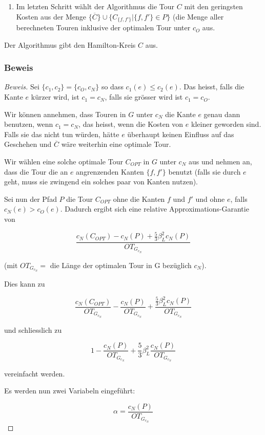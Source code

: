 \documentclass[a4paper,11pt]{scrreprt}
\begin{document}
\begin{enumerate}
\item Im letzten Schritt wählt der Algorithmus die Tour $C$ mit den geringsten Kosten aus der Menge $\{\overline{C}\} \cup \{C_{\{f, f'\}} | \{f, f'\} \in P \}$ (die Menge aller berechneten Touren inklusive der optimalen Tour unter $c_O$ aus.
\end{enumerate}

Der Algorithmus gibt den Hamilton-Kreis $C$ aus.

\subsubsection{Beweis}

\begin{proof}[Beweis]
Sei $\{c_1, c_2\} = \{c_O, c_N\}$ so dass $c_1(e) \le c_2(e)$. Das heisst, falls die Kante $e$ kürzer wird, ist $c_1 = c_N$, falls sie grösser wird ist $c_1 = c_O$.

Wir können annehmen, dass Touren in $G$ unter $c_N$ die Kante $e$ genau dann benutzen, wenn $c_1 = c_N$, das heisst, wenn die Kosten von $e$ kleiner geworden sind. Falls sie das nicht tun würden, hätte $e$ überhaupt keinen Einfluss auf das Geschehen und $\overline{C}$ wäre weiterhin eine optimale Tour. 

Wir wählen eine solche optimale Tour $C_{OPT}$ in $G$ unter $c_N$ aus und nehmen an, dass die Tour die an $e$ angrenzenden Kanten $\{f, f'\}$ benutzt (falls sie durch $e$ geht, muss sie zwingend ein solches paar von Kanten nutzen).

Sei nun der Pfad $P$ die Tour $C_{OPT}$ ohne die Kanten $f$ und $f'$ und ohne $e$, falls $c_N(e) > c_O(e)$. Dadurch ergibt sich eine relative Approximations-Garantie von 

\[ \frac{c_N(C_{OPT}) - c_N(P) + \frac{5}{3}\beta_L^2 c_N(P)}{OT_{G_{c_N}}} \]

(mit $OT_{G_{c_N}} =$ die Länge der optimalen Tour in G bezüglich $c_N$). 

Dies kann zu

\[ \frac{c_N(C_{OPT})}{OT_{G_{c_N}}} - \frac{c_N(P)}{OT_{G_{c_N}}} + \frac{\frac{5}{3}\beta_L^2 c_N(P)}{OT_{G_{c_N}}} \]

und schliesslich zu

\[ 1 - \frac{c_N(P)}{OT_{G_{c_N}}} + \frac{5}{3}\beta_L^2 \frac{c_N(P)}{OT_{G_{c_N}}} \]

vereinfacht werden.

Es werden nun zwei Variabeln eingeführt:

\[ \alpha = \frac{c_N(P)}{OT_{G_{c_N}}} \]


\end{proof}
\end{document}
